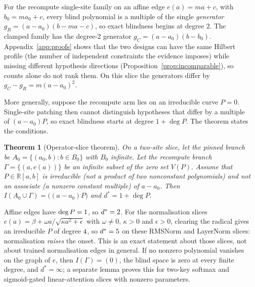 \documentclass{article}
\theoremstyle{plain}
\newtheorem{theorem}{Theorem}
\theoremstyle{definition}
\begin{document}
For the recompute single-site family on an affine edge $e(a)=ma+c$, with $b_0=ma_0+c$, every blind polynomial is a
multiple of the single \emph{generator} $g_R=(a-a_0)(b-ma-c)$, so exact blindness begins at degree $2$. The clamped
family has the degree-2 generator $g_C=(a-a_0)(b-b_0)$. Appendix~\ref{app:proofs} shows that the two designs
can have the same Hilbert profile (the number of independent constraints the evidence imposes) while missing different
hypothesis directions (Proposition~\ref{prop:incomparable}), so counts alone do not rank them. On this slice the
generators differ by $g_C-g_R=m(a-a_0)^2$.

More generally, suppose the recompute arm lies on an irreducible curve $P=0$. Single-site patching then cannot
distinguish hypotheses that differ by a multiple of $(a-a_0)P$, so exact blindness starts at degree $1+\deg P$. The
theorem states the conditions.

\begin{theorem}[Operator-slice theorem]
\label{thm:operator}
On a two-site slice, let the pinned branch be $A_0=\{(a_0,b):b\in B_0\}$ with $B_0$ infinite. Let the
recompute branch $\Gamma=\{(a,e(a))\}$ be an infinite subset of the zero set $V(P)$. Assume that $P\in\mathbb R[a,b]$ is irreducible
(not a product of two nonconstant polynomials) and not an associate (a nonzero constant multiple) of $a-a_0$. Then $I(A_0\cup\Gamma)=\bigl((a-a_0)P\bigr)$ and $d^*=1+\deg P$.
\end{theorem}

Affine edges have $\deg P=1$, so $d^*=2$. For the normalisation slices
$e(a)=\beta+\omega a/\sqrt{\kappa a^2+\epsilon}$ with $\omega\neq0$, $\kappa>0$ and $\epsilon>0$, clearing the radical
gives an irreducible $P$ of degree $4$, so $d^*=5$ on these RMSNorm and LayerNorm slices:
normalisation \emph{raises} the onset. This is an exact statement about those slices, not about trained normalisation
edges in general. If no nonzero polynomial vanishes on the graph of $e$, then $I(\Gamma)=(0)$,
the blind space is zero at every finite degree, and $d^*=\infty$; a separate lemma proves this for two-key softmax
and sigmoid-gated linear-attention slices with nonzero parameters.
\end{document}
